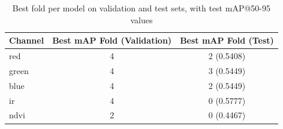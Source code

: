 \begin{table}[h]
\centering
\begin{tabular}{l c c}
\hline
\textbf{Channel} & \textbf{Best mAP Fold (Validation)} & \textbf{Best mAP Fold (Test)} \\ 
\hline
red   & 4 & 2 (0.5408) \\
green & 4 & 3 (0.5449) \\
blue  & 4 & 2 (0.5449) \\
ir    & 4 & 0 (0.5777) \\
ndvi  & 2 & 0 (0.4467) \\
\hline
\end{tabular}
\caption{Best fold per model on validation and test sets, with test mAP@50-95 values}
\label{tab:ablation_best_folds_test}
\end{table}





